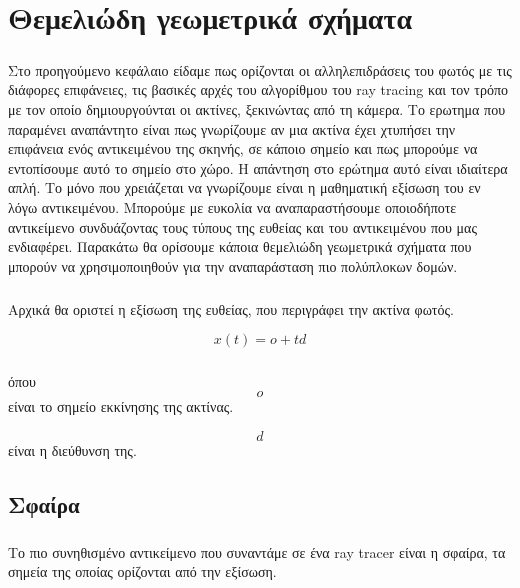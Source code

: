 \chapter{Θεμελιώδη γεωμετρικά σχήματα}

\begin{sloppypar}
\paragraph{}
	Στο προηγούμενο κεφάλαιο είδαμε πως ορίζονται οι αλληλεπιδράσεις του φωτός με τις διάφορες επιφάνειες, τις
βασικές αρχές του αλγορίθμου του ray tracing και τον τρόπο με τον οποίο δημιουργούνται οι ακτίνες, ξεκινώντας 
από τη κάμερα. Το ερωτημα που παραμένει αναπάντητο είναι πως γνωρίζουμε αν μια ακτίνα έχει χτυπήσει την επιφάνεια 
ενός αντικειμένου της σκηνής, σε κάποιο σημείο και πως μπορούμε να εντοπίσουμε αυτό το σημείο στο χώρο. Η απάντηση 
στο ερώτημα αυτό είναι ιδιαίτερα απλή. Το μόνο που χρειάζεται να γνωρίζουμε είναι η μαθηματική εξίσωση του εν λόγω 
αντικειμένου. Μπορούμε με ευκολία να αναπαραστήσουμε οποιοδήποτε αντικείμενο συνδυάζοντας τους τύπους της ευθείας και
του αντικειμένου που μας ενδιαφέρει. Παρακάτω θα ορίσουμε κάποια θεμελιώδη γεωμετρικά σχήματα που μπορούν να 
χρησιμοποιηθούν για την αναπαράσταση πιο πολύπλοκων δομών.

\paragraph{}
Αρχικά θα οριστεί η εξίσωση της ευθείας, που περιγράφει την ακτίνα φωτός.

\begin{equation}
x(t) = o + td
\end{equation}
\paragraph{}
όπου\\

\begin{equation}
o
\end{equation}
είναι το σημείο εκκίνησης της ακτίνας.

\begin{equation}
d
\end{equation}
είναι η διεύθυνση της.

\section{Σφαίρα}
\paragraph{}
	Το πιο συνηθισμένο αντικείμενο που συναντάμε σε ένα ray tracer είναι η σφαίρα, τα σημεία της οποίας ορίζονται από
την εξίσωση.


\end{sloppypar}
